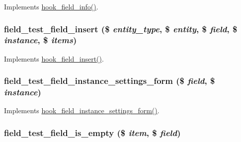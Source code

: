 \label{field__test_8field_8inc_a2ca4cc9829f50f1b4af62c7dd0deedd8}
Implements \hyperlink{group__field__types_gad3eb779f26f41b520f19af011ece3eb1}{hook\_\-field\_\-info()}. \hypertarget{field__test_8field_8inc_aa0e256bbadf643c7fc4471b9d89e5b97}{
\subsubsection[{field\_\-test\_\-field\_\-insert}]{\setlength{\rightskip}{0pt plus 5cm}field\_\-test\_\-field\_\-insert (\$ {\em entity\_\-type}, \/  \$ {\em entity}, \/  \$ {\em field}, \/  \$ {\em instance}, \/  \$ {\em items})}}
\label{field__test_8field_8inc_aa0e256bbadf643c7fc4471b9d89e5b97}
Implements \hyperlink{group__field__types_ga2d29ec2e4a47170d5aaaf41bdd4813df}{hook\_\-field\_\-insert()}. \hypertarget{field__test_8field_8inc_a91617d4f37b83ba80955d8adf798fe60}{
\subsubsection[{field\_\-test\_\-field\_\-instance\_\-settings\_\-form}]{\setlength{\rightskip}{0pt plus 5cm}field\_\-test\_\-field\_\-instance\_\-settings\_\-form (\$ {\em field}, \/  \$ {\em instance})}}
\label{field__test_8field_8inc_a91617d4f37b83ba80955d8adf798fe60}
Implements \hyperlink{group__field__types_gacce0ff92e36c0054ad131d95e576a13a}{hook\_\-field\_\-instance\_\-settings\_\-form()}. \hypertarget{field__test_8field_8inc_a6334e0fe1febc5e87cfa9f2f5eabf57e}{
\subsubsection[{field\_\-test\_\-field\_\-is\_\-empty}]{\setlength{\rightskip}{0pt plus 5cm}field\_\-test\_\-field\_\-is\_\-empty (\$ {\em item}, \/  \$ {\em field})}}
